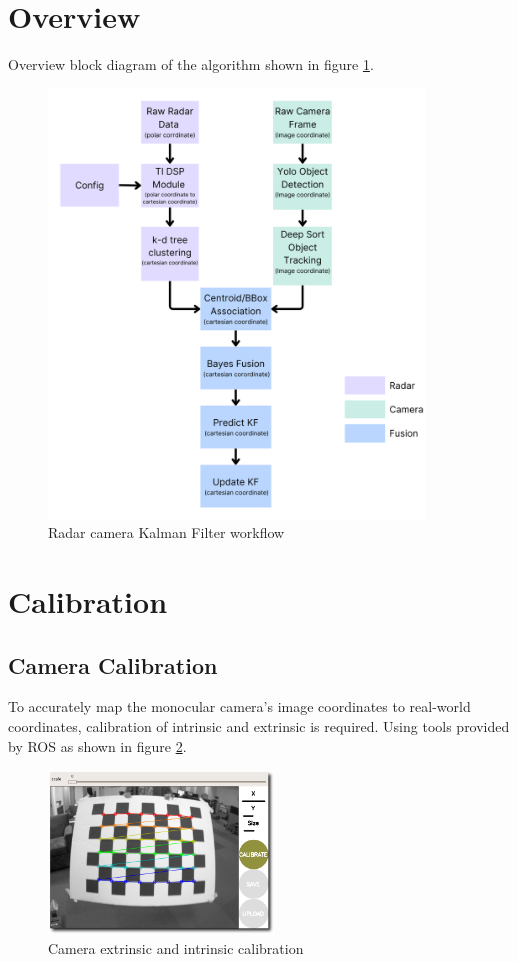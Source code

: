 \section{Overview}\label{sec:2-overview}
Overview block diagram of the algorithm shown in figure \ref*{fig:kf_update}.
\begin{figure}[hpbt]
    \centering
    \includegraphics[width=10cm]{Figures/kf_update-modified.png}%
    \caption{Radar camera Kalman Filter workflow}
    \label{fig:kf_update}
\end{figure}

\section{Calibration}\label{sec:2-calibration}
\subsection{Camera Calibration}
To accurately map the monocular camera's image coordinates to real-world coordinates, calibration of intrinsic and extrinsic is required.
Using tools provided by ROS \cite{cam_calib} as shown in figure \ref*{fig:camera_calibration}.

\begin{figure}[hpbt]
    \centering
    \includegraphics[width=6cm]{Figures/cam_calib.png}%
    \caption{Camera extrinsic and intrinsic calibration}
    \label{fig:camera_calibration}
\end{figure}

